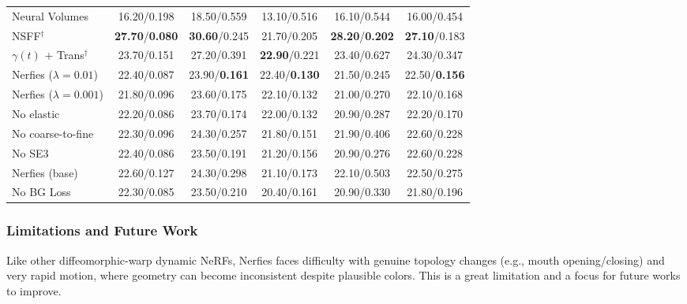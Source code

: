 \begin{enrichment}
\begin{enrichment}
\begin{table}[H]
\begin{minipage}{0.85\textwidth}
\begin{tabular}{@{}lccccc@{}}
                    Neural Volumes~\cite{lombardi2019_neuralvolumes}& 16.20/0.198 & 18.50/0.559 & 13.10/0.516 & 16.10/0.544 & 16.00/0.454 \\
                    NSFF$^\dagger$~\cite{li2021_neural}             & \textbf{27.70}/\textbf{0.080} & \textbf{30.60}/0.245 & 21.70/0.205 & \textbf{28.20}/\textbf{0.202} & \textbf{27.10}/0.183 \\
                    $\gamma(t)$ + Trans$^\dagger$~\cite{pumarola2021_dnerf}
                    & 23.70/0.151 & 27.20/0.391 & \textbf{22.90}/0.221 & 23.40/0.627 & 24.30/0.347 \\
                    Nerfies ($\lambda{=}0.01$)                      & 22.40/0.087 & 23.90/\textbf{0.161} & 22.40/\textbf{0.130} & 21.50/0.245 & 22.50/\textbf{0.156} \\
                    Nerfies ($\lambda{=}0.001$)                     & 21.80/0.096 & 23.60/0.175 & 22.10/0.132 & 21.00/0.270 & 22.10/0.168 \\
                    No elastic                                      & 22.20/0.086 & 23.70/0.174 & 22.00/0.132 & 20.90/0.287 & 22.20/0.170 \\
                    No coarse-to-fine                               & 22.30/0.096 & 24.30/0.257 & 21.80/0.151 & 21.90/0.406 & 22.60/0.228 \\
                    No SE3                                          & 22.40/0.086 & 23.50/0.191 & 21.20/0.156 & 20.90/0.276 & 22.60/0.228 \\
                    Nerfies (base)                                  & 22.60/0.127 & 24.30/0.298 & 21.10/0.173 & 22.10/0.503 & 22.50/0.275 \\
                    No BG Loss                                      & 22.30/0.085 & 23.50/0.210 & 20.40/0.161 & 20.90/0.330 & 21.80/0.196 \\
                    \bottomrule
                \end{tabular}
            \end{minipage}
        \end{table}
        
        \subsubsection{Limitations and Future Work}
        \label{subsec:chapter23_nerfies_limitations}
        Like other diffeomorphic-warp dynamic NeRFs, Nerfies faces difficulty with genuine topology changes (e.g., mouth opening/closing) and very rapid motion, where geometry can become inconsistent despite plausible colors. This is a great limitation and a focus for future works to improve. 
        

\end{enrichment}
\end{enrichment}

